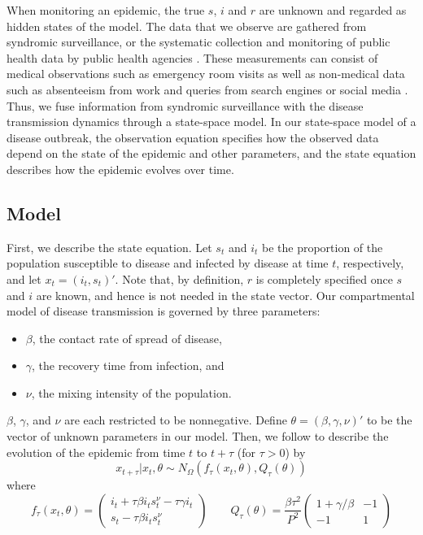 \documentclass{elsarticle}
\begin{document}
When monitoring an epidemic, the true $s$, $i$ and $r$ are unknown and regarded as hidden states of the model. The data that we observe are gathered from syndromic surveillance, or the systematic collection and monitoring of public health data by public health agencies \citep{wagner2006biosurveillance, wilson2006synsurveillance}. These measurements can consist of medical observations such as emergency room visits as well as non-medical data such as absenteeism from work and queries from search engines or social media \citep{chew2010twitter, schuster2010searchquery, signorini2011twitter, Gins:Mohe:Pate:Bram:Smol:Bril:dete:2009}. Thus, we fuse information from syndromic surveillance with the disease transmission dynamics through a state-space model. In our state-space model of a disease outbreak, the observation equation specifies how the observed data depend on the state of the epidemic and other parameters, and the state equation describes how the epidemic evolves over time.

\subsection{Model \label{sec:model}}

First, we describe the state equation. Let $s_t$ and $i_t$ be the proportion of the population susceptible to disease and infected by disease at time $t$, respectively, and let $x_t = (i_t,s_t)'$. Note that, by definition, $r$ is completely specified once $s$ and $i$ are known, and hence is not needed in the state vector. Our compartmental model of disease transmission is governed by three parameters:

\begin{itemize}
\item $\beta$, the contact rate of spread of disease,
\item $\gamma$, the recovery time from infection, and
\item $\nu$, the mixing intensity of the population.
\end{itemize}

\noindent $\beta$, $\gamma$, and $\nu$ are each restricted to be nonnegative. Define $\theta = (\beta,\gamma,\nu)'$ to be the vector of unknown parameters in our model. Then, we follow \citet{skvortsov2012monitoring} to describe the evolution of the epidemic from time $t$ to $t + \tau$ (for $\tau > 0$) by
\begin{equation}
x_{t+\tau}\left|x_t,\theta\right. \sim N_\Omega\left(f_\tau(x_t,\theta),Q_{\tau}(\theta)\right) \label{eqn:state}
\end{equation}
\noindent where
\[
f_\tau(x_t,\theta) = \left(
\begin{array}{c}
i_t +  \tau\beta i_ts^\nu_t - \tau\gamma i_t \\
s_t - \tau\beta i_ts^{\nu}_t \phantom{- \tau\gamma i_t}\,\,
\end{array}
\right)
\qquad
Q_\tau(\theta) = \frac{\beta \tau^2}{P^2} \left(
\begin{array}{ccccc}
1 + \gamma/\beta  & -1 \\
-1 & 1
\end{array}
\right)
\]
\end{document}
